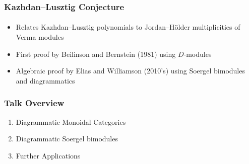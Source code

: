 
\begin{frame}
    \frametitle{Kazhdan--Lusztig Conjecture}
    \framesubtitle{}

    \begin{itemize}
        \item Relates Kazhdan--Lusztig polynomials to Jordan--H\"older multiplicities of Verma modules
        \item First proof by Beilinson and Bernstein (1981) using $D$-modules
        \item Algebraic proof by Elias and Williamson (2010's) using Soergel bimodules and diagrammatics
    \end{itemize}
\end{frame}

\begin{frame}
    \frametitle{Talk Overview}

    \begin{enumerate}
        \item Diagrammatic Monoidal Categories
        \item Diagrammatic Soergel bimodules
        \item Further Applications
    \end{enumerate}
\end{frame}
